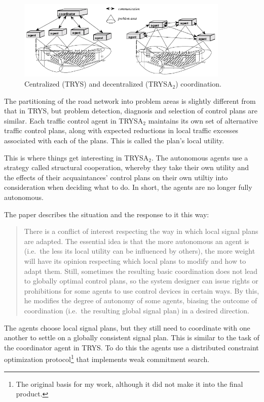 \documentclass[11pt,letterpaper,onecolumn,twoside,openright,final]{report}
\begin{document}
\begin{figure}[h]
  \includegraphics[width=0.9\textwidth]{figures/TRYS-and-TRYSA2.PNG}
  \caption{Centralized (TRYS) and decentralized (TRYSA$_{2}$) coordination.}
  \label{fig:TRYS-and-TRYSA2}
\end{figure}

The partitioning of the road network into problem areas is slightly different from that in TRYS, but problem detection, diagnosis and selection of control plans are similar.
Each traffic control agent in TRYSA$_{2}$ maintains its own set of alternative traffic control plans, along with expected reductions in local traffic excesses associated with each of the plans.
This is called the plan's local utility.

This is where things get interesting in TRYSA$_{2}$.
The autonomous agents use a strategy called structural cooperation\cite{ossowski1999}, whereby they take their own utility and the effects of their acquaintances' control plans on their own utiltiy into consideration when deciding what to do.
In short, the agents are no longer fully autonomous.

The paper describes the situation and the response to it this way:

\begin{quote}
There is a conflict of interest respecting the way in which local signal plans are adapted.
The essential idea is that the more autonomous an agent is (i.e.~the less its local utility can be influenced by others), the more weight will have its opinion respecting which local plans to modify and how to adapt them.
Still, sometimes the resulting basic coordination does not lead to globally optimal control plans, so the system designer can issue rights or prohibitions for some agents to use control devices in certain ways.
By this, he modifies the degree of autonomy of some agents, biasing the outcome of coordination (i.e.~the resulting global signal plan) in a desired direction.
\end{quote}

The agents choose local signal plans, but they still need to coordinate with one another to settle on a globally consistent signal plan.
This is similar to the task of the coordinator agent in TRYS.
To do this the agents use a distributed constraint optimization protocol\footnote{The original basis for my work, although it did not make it into the final product.} that implements weak commitment search\cite{yokoo1999}.
\end{document}
